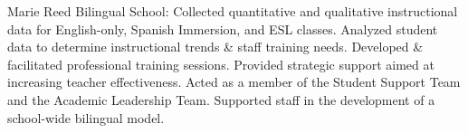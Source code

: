 \documentclass[]{scrartcl}
\begin{document}
\begin{cleanCV}
\JobDesc
{Marie Reed Bilingual School: }
{Collected quantitative and qualitative instructional data for English-only, Spanish Immersion, and ESL classes. Analyzed student data to determine instructional trends \& staff training needs. Developed \& facilitated professional training sessions. Provided strategic support aimed at increasing teacher effectiveness. Acted as a member of the  Student Support Team and the Academic Leadership Team. Supported staff in the development of a school-wide bilingual model.}





  







\end{cleanCV}
\end{document}
